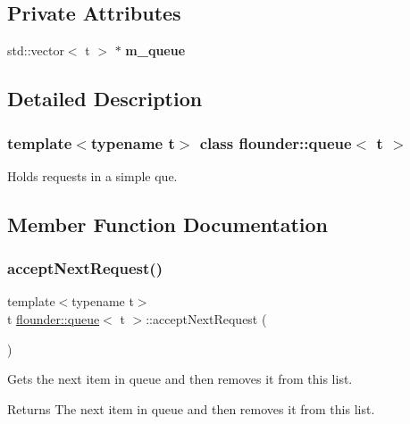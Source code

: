 \subsection*{Private Attributes}
\begin{DoxyCompactItemize}
\item 
\mbox{\label{classflounder_1_1queue_a0569e6435d1f9c10f6537d193e1a7b41}} 
std\+::vector$<$ t $>$ $\ast$ {\bfseries m\+\_\+queue}
\end{DoxyCompactItemize}


\subsection{Detailed Description}
\subsubsection*{template$<$typename t$>$\newline
class flounder\+::queue$<$ t $>$}

Holds requests in a simple que. 



\subsection{Member Function Documentation}
\mbox{\label{classflounder_1_1queue_a67b97eab69c4ac95fe31d948a569ccce}} 
\subsubsection{\texorpdfstring{accept\+Next\+Request()}{acceptNextRequest()}}
{\footnotesize\ttfamily template$<$typename t$>$ \\
t \hyperlink{classflounder_1_1queue}{flounder\+::queue}$<$ t $>$\+::accept\+Next\+Request (\begin{DoxyParamCaption}{ }\end{DoxyParamCaption})\hspace{0.3cm}{\ttfamily [inline]}}



Gets the next item in queue and then removes it from this list. 

\begin{DoxyReturn}{Returns}
The next item in queue and then removes it from this list. 
\end{DoxyReturn}
\mbox{\label{classflounder_1_1queue_aa2f18bafcb4007630ca63b347b478a66}} 
